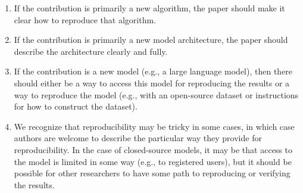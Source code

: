 \documentclass{article}
\theoremstyle{plain}
\theoremstyle{definition}
\theoremstyle{remark}
\begin{document}
\begin{enumerate}
\begin{itemize}
        \begin{enumerate}
            \item If the contribution is primarily a new algorithm, the paper should make it clear how to reproduce that algorithm.
            \item If the contribution is primarily a new model architecture, the paper should describe the architecture clearly and fully.
            \item If the contribution is a new model (e.g., a large language model), then there should either be a way to access this model for reproducing the results or a way to reproduce the model (e.g., with an open-source dataset or instructions for how to construct the dataset).
            \item We recognize that reproducibility may be tricky in some cases, in which case authors are welcome to describe the particular way they provide for reproducibility. In the case of closed-source models, it may be that access to the model is limited in some way (e.g., to registered users), but it should be possible for other researchers to have some path to reproducing or verifying the results.
        \end{enumerate}
    \end{itemize}


\end{enumerate}
\end{document}
